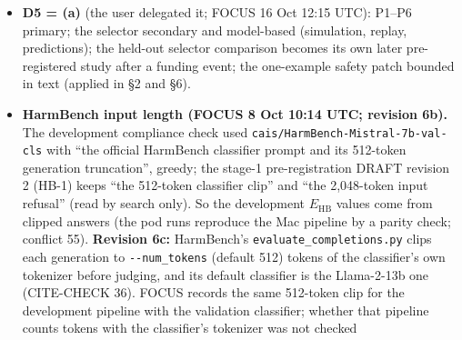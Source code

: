 \documentclass{article}
\theoremstyle{plain}
\theoremstyle{definition}
\theoremstyle{remark}
\begin{document}
\begin{itemize}
        2.0 h (cap 4.5 h). Sealed file \nolinkurl{gate_b_rankings.json}, SHA-256
        d6d5cd6b\ldots{}. \textbf{Rankings} (Dolly categories, top first):
        attribution general\_qa $>$ summarization $>$ brainstorming $>$ open\_qa
        $>$ closed\_qa $>$ classification $>$ information\_extraction $>$
        creative\_writing; representation general\_qa $>$ summarization $>$
        open\_qa $>$ brainstorming $>$ classification $>$ closed\_qa $>$
        creative\_writing $>$ information\_extraction; classifier (report only)
        brainstorming $>$ creative\_writing $>$ closed\_qa $>$ classification
        $>$ general\_qa $>$ open\_qa $>$ summarization $>$
        information\_extraction. \textbf{pick\_A = pick\_R = general\_qa;
        pick\_F = classification;} pick\_A = pick\_F false; pick\_R = pick\_F
        false. Spearman $\rho$ with first5\_share: attribution $-$0.17,
        representation $-$0.14, classifier $-$0.17; classifier informative.
        These are Gate B values seen before the stage-1 commitments are frozen
        (\S{}4.9). Spend in waves 0a--0b: USD 11.26.
  \item \textbf{D5 = (a)} (the user delegated it; FOCUS 16 Oct 12:15 UTC):
        P1--P6 primary; the selector secondary and model-based (simulation,
        replay, predictions); the held-out selector comparison becomes its own
        later pre-registered study after a funding event; the one-example safety
        patch bounded in text (applied in \S{}2 and \S{}6).
  \item \textbf{HarmBench input length (FOCUS 8 Oct 10:14 UTC; revision 6b).}
        The development compliance check used
        \nolinkurl{cais/HarmBench-Mistral-7b-val-cls} with ``the official
        HarmBench classifier prompt and its 512-token generation truncation'',
        greedy; the stage-1 pre-registration DRAFT revision 2 (HB-1) keeps ``the
        512-token classifier clip'' and ``the 2,048-token input refusal'' (read
        by search only). So the development $E_{\mathrm{HB}}$ values come from
        clipped answers (the pod runs reproduce the Mac pipeline by a parity
        check; conflict 55). \textbf{Revision 6c:} HarmBench's
        \nolinkurl{evaluate_completions.py} clips each generation to
        \nolinkurl{--num_tokens} (default 512) tokens of the classifier's own
        tokenizer before judging, and its default classifier is the Llama-2-13b
        one (CITE-CHECK 36). FOCUS records the same 512-token clip for the
        development pipeline with the validation classifier; whether that
        pipeline counts tokens with the classifier's tokenizer was not checked

\end{itemize}
\end{document}
